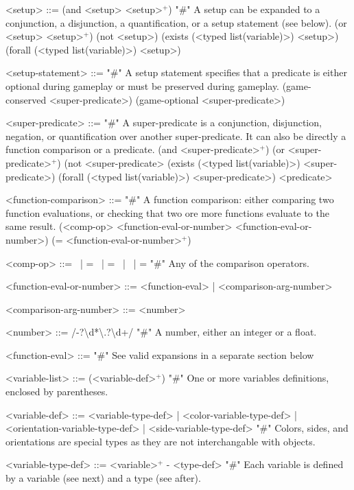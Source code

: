 \documentclass{article}
\begin{document}
\begin{grammar}
<setup> ::= (and <setup> <setup>$^+$) "#" A setup can be expanded to a conjunction, a disjunction, a quantification, or a setup statement (see below).
    \alt (or <setup> <setup>$^+$)
    \alt (not <setup>)
    \alt (exists (<typed list(variable)>) <setup>)
    \alt (forall (<typed list(variable)>) <setup>)

<setup-statement> ::= "#" A setup statement specifies that a predicate is either optional during gameplay or must be preserved during gameplay.
    \alt (game-conserved <super-predicate>)
    \alt (game-optional <super-predicate>)

<super-predicate> ::= "#" A super-predicate is a conjunction, disjunction, negation, or quantification over another super-predicate. It can also be directly a function comparison or a predicate.
    \alt (and <super-predicate>$^+$)
    \alt (or <super-predicate>$^+$)
    \alt (not <super-predicate>
    \alt (exists (<typed list(variable)>) <super-predicate>)
    \alt (forall (<typed list(variable)>) <super-predicate>)
    \alt <predicate>


<function-comparison> ::= "#" A function comparison: either comparing two function evaluations, or checking that two ore more functions evaluate to the same result.
    \alt (<comp-op> <function-eval-or-number> <function-eval-or-number>)
    \alt (= <function-eval-or-number>$^+$)

<comp-op> ::=  \textlangle \ | \textlangle = \ | = \ | \textrangle \ | \textrangle = "#" Any of the comparison operators.

<function-eval-or-number> ::= <function-eval> | <comparison-arg-number>

<comparison-arg-number> ::= <number>

<number> ::=  /-?\textbackslash d*\textbackslash .?\textbackslash d+/  "#" A number, either an integer or a float.

<function-eval> ::= "#" See valid expansions in a separate section below


<variable-list> ::= (<variable-def>$^+$) "#" One or more variables definitions, enclosed by parentheses.

<variable-def> ::= <variable-type-def> | <color-variable-type-def> | <orientation-variable-type-def> | <side-variable-type-def> "#" Colors, sides, and orientations are special types as they are not interchangable with objects.

<variable-type-def> ::= <variable>$^+$ - <type-def> "#" Each variable is defined by a variable (see next) and a type (see after).


\end{grammar}
\end{document}
